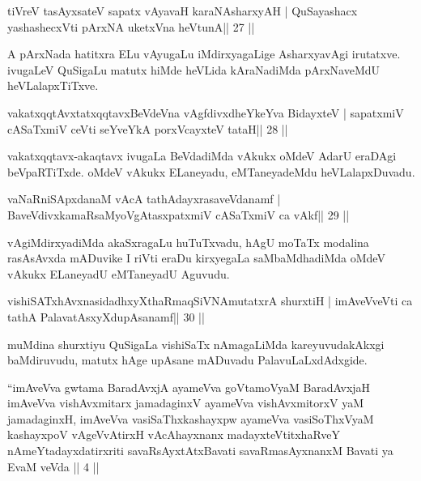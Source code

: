 \begin{shl}
tiVreV tasAyx\s\s sateV sapatx vAyavaH karaNAsharxyAH |
QuSayashacx yashashecxVti pArxNA uketxVna heVtunA\hfill || 27 ||
\end{shl}

\begin{artha}
A pArxNada hatitxra ELu vAyugaLu iMdirxyagaLige AsharxyavAgi irutatxve. ivugaLeV QuSigaLu matutx hiMde heVLida kAraNadiMda pArxNaveMdU heVLalapxTiTxve.
\end{artha}

\begin{shl}
vakatxqqtAvxtatxqqtavxBeVdeVna vAgfdivxdheYkeYva BidayxteV |
sapatxmiV cASaTxmiV ceVti seYveYkA porxVcayxteV tataH\hfill || 28 ||
\end{shl}

\begin{artha}
vakatxqqtavx-akaqtavx ivugaLa BeVdadiMda vAkukx oMdeV AdarU eraDAgi beVpaRTiTxde. oMdeV vAkukx ELaneyadu, eMTaneyadeMdu heVLalapxDuvadu.
\end{artha}



\begin{shl}
vaNaRniSApxdanaM vAcA tathA\s\s dayxrasaveVdanamf |
BaveVdivxkamaRsaMyoVgAtasxpatxmiV cASaTxmiV ca vAkf\hfill || 29 ||
\end{shl}

\begin{artha}
vAgiMdirxyadiMda akaSxragaLu huTuTxvadu, hAgU moTaTx modalina rasAsAvxda mADuvike I riVti eraDu kirxyegaLa saMbaMdhadiMda oMdeV vAkukx ELaneyadU eMTaneyadU Aguvudu.
\end{artha}


\begin{shl}
vishiSATxhAvxnasidadhxyXthaRmaqSiVNAmutatxrA shurxtiH |
imAveVveVti ca tathA PalavatAsxyXdupAsanamf\hfill || 30 ||
\end{shl}

\begin{artha}
muMdina shurxtiyu QuSigaLa vishiSaTx nAmagaLiMda kareyuvudakAkxgi
baMdiruvudu, matutx hAge upAsane mADuvadu PalavuLaLxdAdxgide.
\end{artha}


{}

\begin{shl}
``imAveVva gwtama BaradAvxjA ayameVva goVtamoV\s yaM BaradAvxjaH
  imAveVva vishAvxmitarx jamadaginxV ayameVva vishAvxmitorxV\s
  yaM jamadaginxH, imAveVva vasiSaThxkashayxpw ayameVva vasiSoThxV\s yaM
  kashayxpoV vAgeVvAtirxH vAcAhayxnanx madayxteV\s titxhaRveY
  nAmeYtadayxdatirxriti savaRsAyxtAtxBavati savaRmasAyxnanxM Bavati
  ya EvaM veVda || 4 ||
\end{shl}

